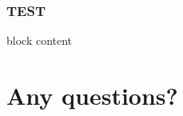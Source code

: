 \documentclass[aspectratio=169]{beamer}
\begin{document}
\begin{frame}[fragile,t]
  \frametitle{TEST}
  \begin{block}{block}
    content
  \end{block}
\end{frame}


\section{Any questions?}


%   
%   





\end{document}
